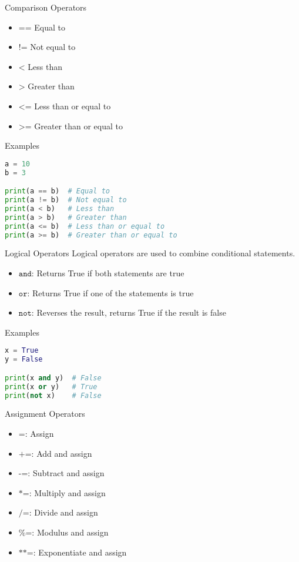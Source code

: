 \begin{frame}{Comparison Operators}
\begin{itemize}
    \item \(\texttt{==}\) Equal to
    \item \(\texttt{!=}\) Not equal to
    \item \(\texttt{<}\) Less than
    \item \(\texttt{>}\) Greater than
    \item \(\texttt{<=}\) Less than or equal to
    \item \(\texttt{>=}\) Greater than or equal to
\end{itemize}
\end{frame}

\begin{frame}[fragile]{Examples}
\begin{lstlisting}[language=python]
a = 10
b = 3

print(a == b)  # Equal to
print(a != b)  # Not equal to
print(a < b)   # Less than
print(a > b)   # Greater than
print(a <= b)  # Less than or equal to
print(a >= b)  # Greater than or equal to
\end{lstlisting}
\end{frame}


\begin{frame}{Logical Operators}
Logical operators are used to combine conditional statements.
\begin{itemize}
    \item \(\texttt{and}\): Returns True if both statements are true
    \item \(\texttt{or}\): Returns True if one of the statements is true
    \item \(\texttt{not}\): Reverses the result, returns True if the result is false
\end{itemize}
\end{frame}

\begin{frame}[fragile]{Examples}
\begin{lstlisting}[language=python]
x = True
y = False

print(x and y)  # False
print(x or y)   # True
print(not x)    # False
\end{lstlisting}
\end{frame}

\begin{frame}{Assignment Operators}
\begin{itemize}
    \item \(\texttt{=}\): Assign
    \item \(\texttt{+=}\): Add and assign
    \item \(\texttt{-=}\): Subtract and assign
    \item \(\texttt{*=}\): Multiply and assign
    \item \(\texttt{/=}\): Divide and assign
    \item \(\texttt{\%=}\): Modulus and assign
    \item \(\texttt{**=}\): Exponentiate and assign
\end{itemize}
\end{frame}

